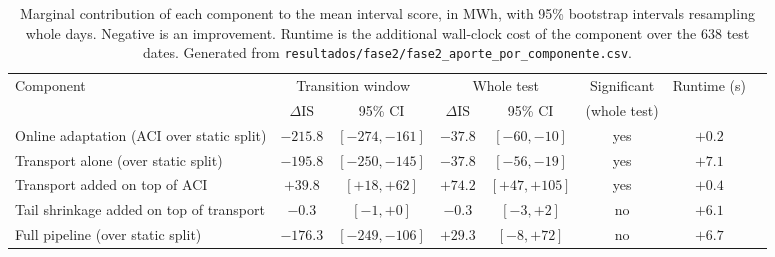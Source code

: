 \begin{table}[t]
\centering
\footnotesize
\caption{Marginal contribution of each component to the mean interval score, in MWh, with 95\% bootstrap intervals resampling whole days. Negative is an improvement. Runtime is the additional wall-clock cost of the component over the 638 test dates. Generated from \texttt{resultados/fase2/fase2\_aporte\_por\_componente.csv}.}
\label{tab:ablaciones}
\begin{tabular}{lccccccc}
\toprule
Component & \multicolumn{2}{c}{Transition window} & \multicolumn{2}{c}{Whole test} & Significant & Runtime (s) \\
\cmidrule(lr){2-3}\cmidrule(lr){4-5}
 & $\Delta\mathrm{IS}$ & 95\% CI & $\Delta\mathrm{IS}$ & 95\% CI & (whole test) & \\
\midrule
Online adaptation (ACI over static split) & $-215.8$ & $[-274, -161]$ & $-37.8$ & $[-60, -10]$ & yes & $+0.2$ \\
Transport alone (over static split) & $-195.8$ & $[-250, -145]$ & $-37.8$ & $[-56, -19]$ & yes & $+7.1$ \\
Transport added on top of ACI & $+39.8$ & $[+18, +62]$ & $+74.2$ & $[+47, +105]$ & yes & $+0.4$ \\
Tail shrinkage added on top of transport & $-0.3$ & $[-1, +0]$ & $-0.3$ & $[-3, +2]$ & no & $+6.1$ \\
Full pipeline (over static split) & $-176.3$ & $[-249, -106]$ & $+29.3$ & $[-8, +72]$ & no & $+6.7$ \\
\bottomrule
\end{tabular}
\end{table}
